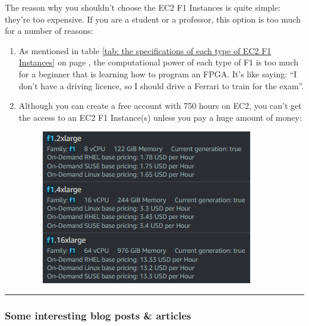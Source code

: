 \documentclass[a4paper]{article}
\newcommand{\dquotes}[1]{``#1''}
\newcommand{\longline}{\noindent\rule{\textwidth}{0.4pt}}
\begin{document}
    The reason why you shouldn't choose the EC2 F1 Instances is quite simple: they're too expensive. If you are a student or a professor, this option is too much for a number of reasons:
    \begin{enumerate}
        \item As mentioned in table \ref{tab: the specifications of each type of EC2 F1 Instances} on page \pageref{tab: the specifications of each type of EC2 F1 Instances}, the computational power of each type of F1 is too much for a beginner that is learning how to program an FPGA. It's like saying: \dquotes{I don't have a driving licence, so I should drive a Ferrari to train for the exam}.

        \item Although you can create a free account with 750 hours on EC2, you can't get the access to an EC2 F1 Instance(s) unless you pay a huge amount of money:
        \begin{figure}[!htp]
            \centering
            \includegraphics[width=.6\textwidth]{img/f1_costs.png}
        \end{figure}
    \end{enumerate}

    \longline

    \subsubsection{Some interesting blog posts \& articles}
\end{document}
